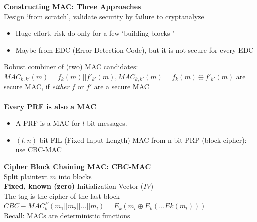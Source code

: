 \documentclass{article}
\begin{document}
\noindent \textbf{Constructing MAC: Three Approaches}\\
Design \lq from scratch\rq, validate security by failure to cryptanalyze\\
\begin{itemize}
	\item Huge effort, risk do only for a few \lq building blocks \rq
	\item Maybe from EDC (Error Detection Code), but it is not secure for every EDC
	\end{itemize}
Robust combiner of (two) MAC candidates:\\
$MAC_{k,k'}(m)=f_k(m)||f'_{k'}(m), MAC_{k,k'}(m)=f_k(m)\oplus f'_{k'}(m)$ are secure MAC, if \textit{either} $f$ or $f'$ are a secure MAC\\
\\\textbf{Every PRF is also a MAC}
\begin{itemize}
	\item A PRF is a MAC for $l$-bit messages.
	\item $(l,n)$-bit FIL (Fixed Input Length) MAC from n-bit PRP (block cipher): use CBC-MAC
\end{itemize}
\textbf{Cipher Block Chaining MAC: CBC-MAC}\\
Split plaintext $m$ into blocks\\
\textbf{Fixed, known (zero)} Initialization Vector ($IV$)\\
The tag is the cipher of the last block $CBC-MAC^E_k(m_1||m_2||...||m_l) = E_k(m_l\oplus E_k(...Ek(m_l)))$\\
Recall: MACs are deterministic functions\\
\end{document}

